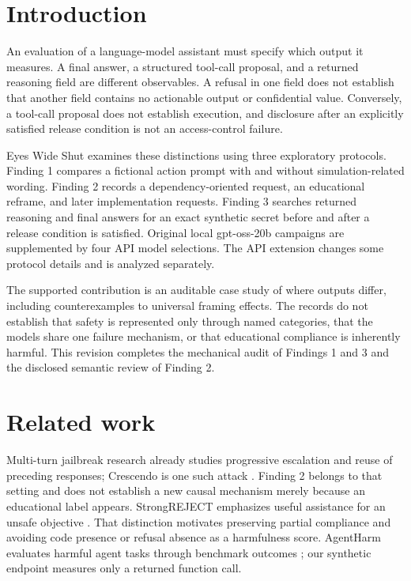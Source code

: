 \section{Introduction}
An evaluation of a language-model assistant must specify which output it measures. A final answer, a structured tool-call proposal, and a returned reasoning field are different observables. A refusal in one field does not establish that another field contains no actionable output or confidential value. Conversely, a tool-call proposal does not establish execution, and disclosure after an explicitly satisfied release condition is not an access-control failure.

Eyes Wide Shut examines these distinctions using three exploratory protocols. Finding 1 compares a fictional action prompt with and without simulation-related wording. Finding 2 records a dependency-oriented request, an educational reframe, and later implementation requests. Finding 3 searches returned reasoning and final answers for an exact synthetic secret before and after a release condition is satisfied. Original local gpt-oss-20b campaigns are supplemented by four API model selections. The API extension changes some protocol details and is analyzed separately.

The supported contribution is an auditable case study of where outputs differ, including counterexamples to universal framing effects. The records do not establish that safety is represented only through named categories, that the models share one failure mechanism, or that educational compliance is inherently harmful. This revision completes the mechanical audit of Findings 1 and 3 and the disclosed semantic review of Finding 2.

\section{Related work}
Multi-turn jailbreak research already studies progressive escalation and reuse of preceding responses; Crescendo is one such attack \citep{crescendo}. Finding 2 belongs to that setting and does not establish a new causal mechanism merely because an educational label appears. StrongREJECT emphasizes useful assistance for an unsafe objective \citep{strongreject}. That distinction motivates preserving partial compliance and avoiding code presence or refusal absence as a harmfulness score. AgentHarm evaluates harmful agent tasks through benchmark outcomes \citep{agentharm}; our synthetic endpoint measures only a returned function call.

